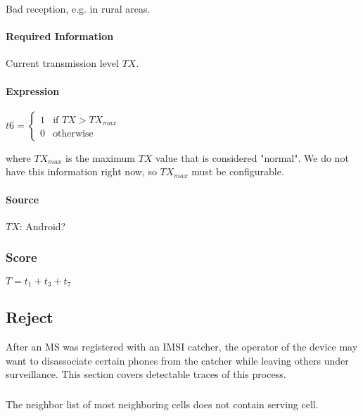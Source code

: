 \documentclass[a4paper,11pt,notitlepage,bigheadings,oneside]{scrartcl}
\begin{document}
Bad reception, e.g. in rural areas.

\paragraph{Required Information}

Current transmission level $TX$.

\paragraph{Expression}

$t6 =
\begin{cases}
	1 & \text{if } TX > TX_{max} \\
	0 & \text{otherwise}
\end{cases}$

where $TX_{max}$ is the maximum $TX$ value that is considered "normal". We do
not have this information right now, so $TX_{max}$ must be configurable.

\paragraph{Source}

$TX$: Android?


\subsubsection{Score}

$T = t_1 + t_3 + t_7$

\subsection{Reject}

After an MS was registered with an IMSI catcher, the operator of the device may
want to disassociate certain phones from the catcher while leaving others under
surveillance. This section covers detectable traces of this process.

\subsubsection{}

The neighbor list of most neighboring cells does not contain serving cell.
\end{document}
